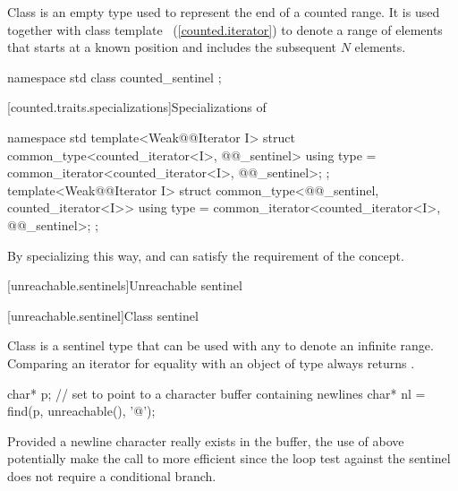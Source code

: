 \begin{addedblock}
{\pnum
Class  is an empty type used to represent the end of a counted
range. It is used together with class template
~(\ref{counted.iterator}) to denote a range of elements that
starts at a known position and includes the subsequent $N$ elements.

%
\begin{itemdecl}
namespace std {
  class counted_sentinel { };
}
\end{itemdecl}
}

[counted.traits.specializations]{Specializations of }

%
\begin{itemdecl}
namespace std {
  template<Weak@@Iterator I>
  struct common_type<counted_iterator<I>, @@_sentinel> {
    using type = common_iterator<counted_iterator<I>, @@_sentinel>;
  };
  template<Weak@@Iterator I>
  struct common_type<@@_sentinel, counted_iterator<I>> {
    using type = common_iterator<counted_iterator<I>, @@_sentinel>;
  };
}
\end{itemdecl}

\begin{itemdescr}
\pnum
\enternote By specializing  this way, 
and  can satisfy the  requirement of the
 concept.\exitnote
\end{itemdescr}

[unreachable.sentinels]{Unreachable sentinel}

[unreachable.sentinel]{Class  sentinel}

\pnum
{}%
Class  is a sentinel type that can be used with any
 to denote an infinite range. Comparing an iterator for equality with
an object of type  always returns .

\enterexample
\begin{codeblock}
char* p;
// set  to point to a character buffer containing newlines
char* nl = find(p, unreachable(), '@\textbackslash@n');
\end{codeblock}

Provided a newline character really exists in the buffer, the use of 
above potentially make the call to  more efficient since the loop test against
the sentinel does not require a conditional branch.
\exitexample


\end{addedblock}
